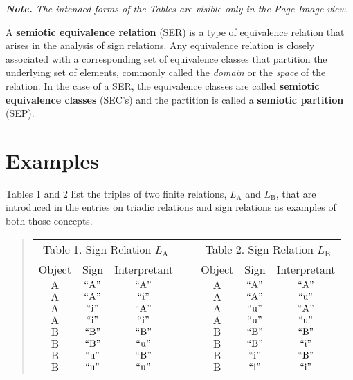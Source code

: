 \documentclass[12pt]{article}
\begin{document}
\textit{\textbf{Note.}  The intended forms of the Tables are visible only in the Page Image view.}

A \textbf{semiotic equivalence relation} (SER) is a type of equivalence relation that arises in the analysis of sign relations.  Any equivalence relation is closely associated with a corresponding set of equivalence classes that partition the underlying set of elements, commonly called the \textit{domain} or the \textit{space} of the relation.  In the case of a SER, the equivalence classes are called \textbf{semiotic equivalence classes} (SEC's) and the partition is called a \textbf{semiotic partition} (SEP).

\tableofcontents

\section{Examples}

Tables 1 and 2 list the triples of two finite relations, $L_{\mathrm{A}}$ and $L_{\mathrm{B}}$, that are introduced in the entries on triadic relations and sign relations as examples of both those concepts.

\begin{quote}\begin{tabular}{|c|c|c|p{2cm}|c|c|c|}
\multicolumn{3}{c}{Table 1.  Sign Relation $L_{\mathrm{A}}$} &
\multicolumn{1}{c}{~} &
\multicolumn{3}{c}{Table 2.  Sign Relation $L_{\mathrm{B}}$} \\
\cline{1-3}\cline{5-7}
Object & Sign & Interpretant & & Object & Sign & Interpretant \\
\cline{1-3}\cline{5-7}
$\mathrm{A}$ & $\mathrm{``A"}$ & $\mathrm{``A"}$ &&
$\mathrm{A}$ & $\mathrm{``A"}$ & $\mathrm{``A"}$ \\
\cline{1-3}\cline{5-7}
$\mathrm{A}$ & $\mathrm{``A"}$ & $\mathrm{``i"}$ &&
$\mathrm{A}$ & $\mathrm{``A"}$ & $\mathrm{``u"}$ \\
\cline{1-3}\cline{5-7}
$\mathrm{A}$ & $\mathrm{``i"}$ & $\mathrm{``A"}$ &&
$\mathrm{A}$ & $\mathrm{``u"}$ & $\mathrm{``A"}$ \\
\cline{1-3}\cline{5-7}
$\mathrm{A}$ & $\mathrm{``i"}$ & $\mathrm{``i"}$ &&
$\mathrm{A}$ & $\mathrm{``u"}$ & $\mathrm{``u"}$ \\
\cline{1-3}\cline{5-7}
$\mathrm{B}$ & $\mathrm{``B"}$ & $\mathrm{``B"}$ &&
$\mathrm{B}$ & $\mathrm{``B"}$ & $\mathrm{``B"}$ \\
\cline{1-3}\cline{5-7}
$\mathrm{B}$ & $\mathrm{``B"}$ & $\mathrm{``u"}$ &&
$\mathrm{B}$ & $\mathrm{``B"}$ & $\mathrm{``i"}$ \\
\cline{1-3}\cline{5-7}
$\mathrm{B}$ & $\mathrm{``u"}$ & $\mathrm{``B"}$ &&
$\mathrm{B}$ & $\mathrm{``i"}$ & $\mathrm{``B"}$ \\
\cline{1-3}\cline{5-7}
$\mathrm{B}$ & $\mathrm{``u"}$ & $\mathrm{``u"}$ &&
$\mathrm{B}$ & $\mathrm{``i"}$ & $\mathrm{``i"}$ \\
\cline{1-3}\cline{5-7}
\end{tabular}\end{quote}
\end{document}
